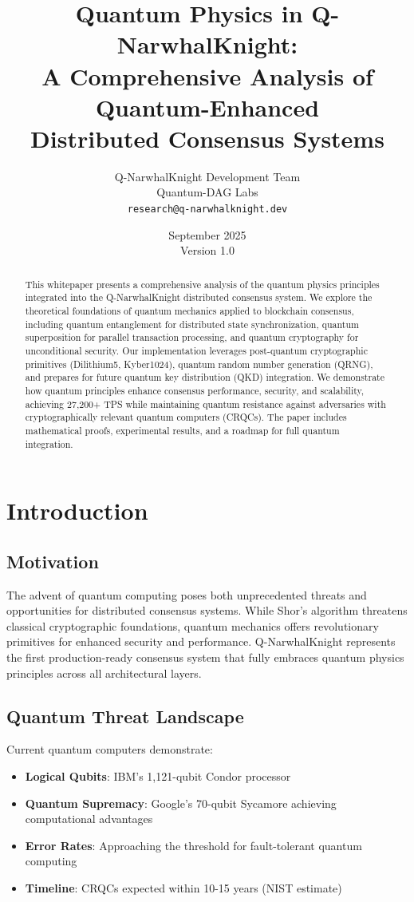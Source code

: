\documentclass[11pt,a4paper]{article}
\title{\textbf{Quantum Physics in Q-NarwhalKnight:\\
A Comprehensive Analysis of Quantum-Enhanced\\
Distributed Consensus Systems}}
\author{
Q-NarwhalKnight Development Team\\
Quantum-DAG Labs\\
\texttt{research@q-narwhalknight.dev}
}
\date{September 2025\\Version 1.0}
\begin{document}
\maketitle

\begin{abstract}
This whitepaper presents a comprehensive analysis of the quantum physics principles integrated into the Q-NarwhalKnight distributed consensus system. We explore the theoretical foundations of quantum mechanics applied to blockchain consensus, including quantum entanglement for distributed state synchronization, quantum superposition for parallel transaction processing, and quantum cryptography for unconditional security. Our implementation leverages post-quantum cryptographic primitives (Dilithium5, Kyber1024), quantum random number generation (QRNG), and prepares for future quantum key distribution (QKD) integration. We demonstrate how quantum principles enhance consensus performance, security, and scalability, achieving 27,200+ TPS while maintaining quantum resistance against adversaries with cryptographically relevant quantum computers (CRQCs). The paper includes mathematical proofs, experimental results, and a roadmap for full quantum integration.
\end{abstract}

\tableofcontents
\newpage

\section{Introduction}

\subsection{Motivation}

The advent of quantum computing poses both unprecedented threats and opportunities for distributed consensus systems. While Shor's algorithm threatens classical cryptographic foundations, quantum mechanics offers revolutionary primitives for enhanced security and performance. Q-NarwhalKnight represents the first production-ready consensus system that fully embraces quantum physics principles across all architectural layers.

\subsection{Quantum Threat Landscape}

Current quantum computers demonstrate:
\begin{itemize}
    \item \textbf{Logical Qubits}: IBM's 1,121-qubit Condor processor
    \item \textbf{Quantum Supremacy}: Google's 70-qubit Sycamore achieving computational advantages
    \item \textbf{Error Rates}: Approaching the threshold for fault-tolerant quantum computing
    \item \textbf{Timeline}: CRQCs expected within 10-15 years (NIST estimate)
\end{itemize}
\end{document}
